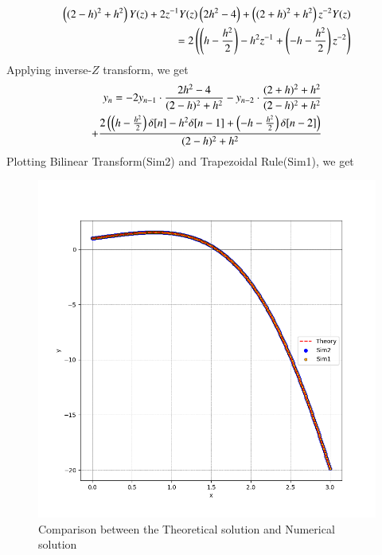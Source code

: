 \documentclass[journal]{IEEEtran}
\begin{document}
		\begin{align}
		{\ensuremath{\left(  \left(2-h\right)^2 + h^2\right)}Y(z)  + 2z^{-1}Y(z) \ensuremath{\left(2h^2 - 4\right)} + \ensuremath{\left(  \left(2+h\right)^2 + h^2\right)}z^{-2} }Y(z)\\
		=  {2\left(\left(h - \frac{h^2}{2}\right) - h^2 z^{-1} + \left(-h - \frac{h^2}{2}\right)z^{-2}\right)}
	\end{align}
	Applying inverse-$Z$ transform, we get
	\begin{align}
		\quad y_n = -2y_{n-1} \cdot \frac{2h^2 - 4}{(2-h)^2 + h^2} - y_{n-2}\cdot \frac{(2+h)^2 + h^2}{(2-h)^2 + h^2} \\ 
		+ \frac{2\left(\left(h- \frac{h^2}{2}\right)\delta[n]  - h^2 \delta[n-1] + \left(-h - \frac{h^2}{2}\right)\delta[n-2]\right)}{(2-h)^2 + h^2}
	\end{align}
	Plotting Bilinear Transform(Sim2) and Trapezoidal Rule(Sim1), we get
	\begin{figure}[h!]
		\centering
		\includegraphics[width=\columnwidth]{figs/fig1.png}
		\caption{Comparison between the Theoretical solution and Numerical solution}
		\label{stemplot}
	\end{figure}
	
\end{document}
